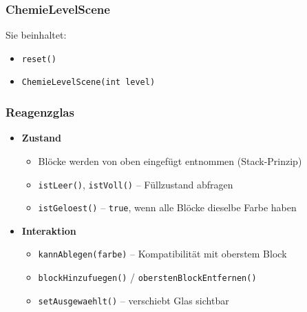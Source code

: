 \begin{frame}
\frametitle{ChemieLevelScene}

Sie beinhaltet:
	\begin{itemize}
		\item \texttt{reset()}
		\item \texttt{ChemieLevelScene(int level)}
	\end{itemize}
\end{frame}

\begin{frame}
    \frametitle{Reagenzglas}

    \begin{itemize}
        \item \textbf{Zustand}
        \begin{itemize}
            \item Blöcke werden von oben eingefügt entnommen (Stack-Prinzip)
            \item \texttt{istLeer()}, \texttt{istVoll()} – Füllzustand abfragen
            \item \texttt{istGeloest()} – \texttt{true}, wenn alle Blöcke dieselbe Farbe haben
        \end{itemize} \pause

        \item \textbf{Interaktion}
        \begin{itemize}
            \item \texttt{kannAblegen(farbe)} – Kompatibilität mit oberstem Block
            \item \texttt{blockHinzufuegen()} / \texttt{oberstenBlockEntfernen()}
            \item \texttt{setAusgewaehlt()} – verschiebt Glas sichtbar
        \end{itemize}
    \end{itemize}
\end{frame}

